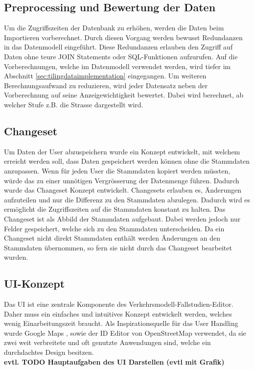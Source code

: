 \subsection{Preprocessing und Bewertung der Daten}\label{sec:concept_preprocessing}
Um die Zugriffszeiten der Datenbank zu erhöhen, werden die Daten beim Importieren vorberechnet. Durch diesen Vorgang werden bewusst Redundanzen in das Datenmodell eingeführt. Diese Redundanzen erlauben den Zugriff auf Daten ohne teure JOIN Statements oder SQL-Funktionen aufzurufen. Auf die Vorberechnungen, welche im Datenmodell verwendet werden, wird tiefer im Abschnitt \ref{sec:tilingdataimplementation}  eingegangen. Um weiteren Berechnungsaufwand zu reduzieren, wird jeder Datensatz neben der Vorberechnung auf seine Anzeigewichtigkeit bewertet. Dabei wird berechnet, ab welcher Stufe z.B. die Strasse dargestellt wird.

\subsection{Changeset}\label{sec:changeset}
Um Daten der User abzuspeichern wurde ein Konzept entwickelt, mit welchem erreicht werden soll, dass Daten gespeichert werden können ohne die Stammdaten anzupassen. Wenn für jeden User die Stammdaten kopiert werden müssten, würde das zu einer unnötigen Vergrösserung der Datenmenge führen. Dadurch wurde das Changeset Konzept entwickelt. Changesets erlauben es, Änderungen aufzuteilen und nur die Differenz zu den Stammdaten abzulegen. Dadurch wird es ermöglicht die Zugriffszeiten auf die Stammdaten konstant zu halten. Das Changeset ist als Abbild der Stammdaten aufgebaut. Dabei werden jedoch nur Felder gespeichert, welche sich zu den Stammdaten unterscheiden. Da ein Changeset nicht direkt Stammdaten enthält werden Änderungen an den Stammdaten übernommen, so fern sie nicht durch das Changeset bearbeitet wurden.
\subsection{UI-Konzept}\label{sec:uiconcept}
Das UI ist eine zentrale Komponente des Verkehrsmodell-Fallstudien-Editor. Daher muss ein einfaches und intuitives Konzept entwickelt werden, welches wenig Einarbeitungszeit braucht. Als Inspirationsquelle für das User Handling wurde Google Maps \cite{GoogleMaps}, sowie der ID Editor \citep{IDEditor} von OpenStreetMap verwendet, da sie zwei weit verbreitete und oft genutzte Anwendungen sind, welche ein durchdachtes Design besitzen.\\[0.8cm]
\textbf{evtl. TODO Hauptaufgaben des UI Darstellen (evtl mit Grafik)}
\newpage
